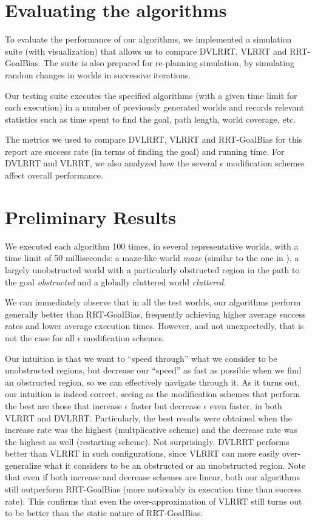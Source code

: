 \documentclass[10pt,twoside,twocolumn]{article}
\begin{document}
\section{Evaluating the algorithms}

To evaluate the performance of our algorithms, we implemented a simulation suite (with visualization) that allows
us to compare DVLRRT, VLRRT and RRT-GoalBias. The suite is also prepared for re-planning simulation, by simulating
random changes in worlds in successive iterations.

Our testing suite executes the specified algorithms (with a given time limit for each execution) in a number of previously
generated worlds and records relevant statistics such as time spent to find the goal, path length, world coverage, etc.

The metrics we used to compare DVLRRT, VLRRT and RRT-GoalBias for this report are success rate (in terms of finding the goal) and running
time. For DVLRRT and VLRRT, we also analyzed how the several $\epsilon$ modification schemes affect overall performance.

\section{Preliminary Results}

We executed each algorithm 100 times, in several representative worlds, with a time limit of 50 milliseconds: 
a maze-like world \emph{maze} (similar to the one in \cite{Bruce02real-timerandomized}), a largely unobstructed world with a particularly obstructed region in
the path to the goal \emph{obstructed} and a globally cluttered world \emph{cluttered}.

We can immediately observe that in all the test worlds, our algorithms perform generally better than RRT-GoalBias,
frequently achieving higher average success rates and lower average execution times. However, and not unexpectedly,
that is not the case for all $\epsilon$ modification schemes. 

Our intuition is that we want to ``speed through'' what we consider to be unobstructed regions, but decrease our
``speed'' as fast as possible when we find an obstructed region, so we can effectively navigate through it. As it turns
out, our intuition is indeed correct, seeing as the modification schemes that perform the best are those that
increase $\epsilon$ faster but decrease $\epsilon$ even faster, in both VLRRT and DVLRRT. Particularly, the best
results were obtained when the increase rate was the highest (multplicative scheme) and the decrease rate was the 
highest as well (restarting scheme).
Not surprisingly,
DVLRRT performs better than VLRRT in such configurations, since VLRRT can more easily over-generalize what it
considers to be an obstructed or an unobstructed region. Note that even if both increase and decrease schemes are
linear, both our algorithms still outperform RRT-GoalBias (more noticeably in execution time than success rate). This
confirms that even the over-approximation of VLRRT still turns out to be better than the static nature of RRT-GoalBias.
\end{document}
